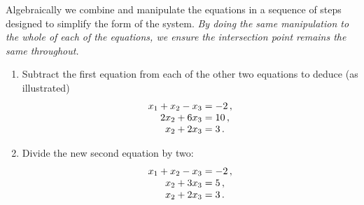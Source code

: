 \begin{example}
\begin{solution}
Algebraically we combine and manipulate the equations in a sequence of steps designed to simplify the form of the system.  
\emph{By doing the same manipulation to the whole of each of the equations, we ensure the intersection point remains the same throughout.}
\begin{enumerate}
\item Subtract the first equation from each of the other two equations to deduce (as illustrated)
\begin{equation*}
\begin{array}{r@{{}={}}l}
x_1+x_2-x_3&-2\,,\\
2x_2+6x_3&10\,,\\
x_2+2x_3&3\,.
\end{array}
\end{equation*}

\item Divide the new second equation by two:
\begin{equation*}
\begin{array}{r@{{}={}}l}
x_1+x_2-x_3&-2\,,\\
x_2+3x_3&5\,,\\
x_2+2x_3&3\,.
\end{array}
\end{equation*}


\end{enumerate}
\end{solution}
\end{example}
